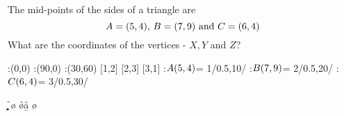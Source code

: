 

\question[5]   The mid-points of the sides of a triangle are 
\[ A = (5,4),\, B=(7,9)\text{ and }C=(6,4) \] 
What are the coordinates of the vertices - $X,Y$ and $Z$?

\watchout

\vspace{0.7cm}
:(0,0)
:(90,0)
:(30,60)
 [1,2]
 [2,3]
 [3,1]
:$A(5,4)$= 1/0.5,10/
:$B(7,9)$= 2/0.5,20/
:$C(6,4)$= 3/0.5,30/
\figdrawbegin{}
	\figdrawline[1,2,3,1]
	\ifprintanswers\figdrawline[11,21,31,11]\fi
\figdrawend
{}
\centerline{\box\figBoxA}

\LINESLOPE\va\vb\vc\vd\a\b
\LINEINTERCEPT\va\vb\a\b\c\d

\LINESLOPE\vc\vd\ve\vf\m\n
\LINEINTERCEPT\ve\vf\m\n\e\f

\LINESLOPE\va\vb\ve\vf\o\p
\LINEINTERCEPT\va\vb\o\p\g\h

\LINEINTERCEPT\ve\vf\a\b\aa\bb
\LINEINTERCEPT\va\vb\m\n\mm\nn
\LINEINTERCEPT\vc\vd\o\p\oo\pp


